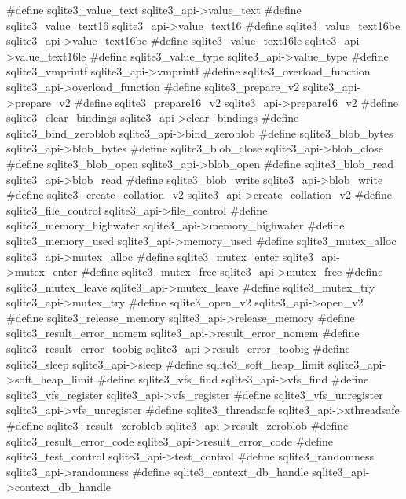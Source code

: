 \begin{Codex}[label=sqlite3ext.h,numbers=left]
#define sqlite3_value_text             sqlite3_api->value_text
#define sqlite3_value_text16           sqlite3_api->value_text16
#define sqlite3_value_text16be         sqlite3_api->value_text16be
#define sqlite3_value_text16le         sqlite3_api->value_text16le
#define sqlite3_value_type             sqlite3_api->value_type
#define sqlite3_vmprintf               sqlite3_api->vmprintf
#define sqlite3_overload_function      sqlite3_api->overload_function
#define sqlite3_prepare_v2             sqlite3_api->prepare_v2
#define sqlite3_prepare16_v2           sqlite3_api->prepare16_v2
#define sqlite3_clear_bindings         sqlite3_api->clear_bindings
#define sqlite3_bind_zeroblob          sqlite3_api->bind_zeroblob
#define sqlite3_blob_bytes             sqlite3_api->blob_bytes
#define sqlite3_blob_close             sqlite3_api->blob_close
#define sqlite3_blob_open              sqlite3_api->blob_open
#define sqlite3_blob_read              sqlite3_api->blob_read
#define sqlite3_blob_write             sqlite3_api->blob_write
#define sqlite3_create_collation_v2    sqlite3_api->create_collation_v2
#define sqlite3_file_control           sqlite3_api->file_control
#define sqlite3_memory_highwater       sqlite3_api->memory_highwater
#define sqlite3_memory_used            sqlite3_api->memory_used
#define sqlite3_mutex_alloc            sqlite3_api->mutex_alloc
#define sqlite3_mutex_enter            sqlite3_api->mutex_enter
#define sqlite3_mutex_free             sqlite3_api->mutex_free
#define sqlite3_mutex_leave            sqlite3_api->mutex_leave
#define sqlite3_mutex_try              sqlite3_api->mutex_try
#define sqlite3_open_v2                sqlite3_api->open_v2
#define sqlite3_release_memory         sqlite3_api->release_memory
#define sqlite3_result_error_nomem     sqlite3_api->result_error_nomem
#define sqlite3_result_error_toobig    sqlite3_api->result_error_toobig
#define sqlite3_sleep                  sqlite3_api->sleep
#define sqlite3_soft_heap_limit        sqlite3_api->soft_heap_limit
#define sqlite3_vfs_find               sqlite3_api->vfs_find
#define sqlite3_vfs_register           sqlite3_api->vfs_register
#define sqlite3_vfs_unregister         sqlite3_api->vfs_unregister
#define sqlite3_threadsafe             sqlite3_api->xthreadsafe
#define sqlite3_result_zeroblob        sqlite3_api->result_zeroblob
#define sqlite3_result_error_code      sqlite3_api->result_error_code
#define sqlite3_test_control           sqlite3_api->test_control
#define sqlite3_randomness             sqlite3_api->randomness
#define sqlite3_context_db_handle      sqlite3_api->context_db_handle

\end{Codex}

